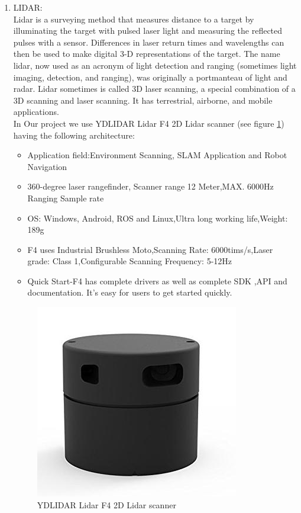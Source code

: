 \begin{enumerate}
   \item LIDAR: \\
   Lidar is a surveying method that measures distance to a target by illuminating the target with pulsed laser light and measuring the reflected pulses with a sensor. Differences in laser return times and wavelengths can then be used to make digital 3-D representations of the target. The name lidar, now used as an acronym of light detection and ranging (sometimes light imaging, detection, and ranging), was originally a portmanteau of light and radar. Lidar sometimes is called 3D laser scanning, a special combination of a 3D scanning and laser scanning. It has terrestrial, airborne, and mobile applications. \cite{web010}\\
   In Our project we use YDLIDAR Lidar F4  2D Lidar scanner (see figure \ref{fig:ydlidar}) having the following architecture:
    
    \begin{itemize}
        \item Application field:Environment Scanning, SLAM Application and Robot Navigation
        \item 360-degree laser rangefinder, Scanner range 12 Meter,MAX. 6000Hz Ranging Sample rate
        \item OS: Windows, Android, ROS and Linux,Ultra long working life,Weight: 189g
        \item F4 uses Industrial Brushless Moto,Scanning Rate: 6000tims/s,Laser grade: Class 1,Configurable Scanning Frequency: 5-12Hz
        \item Quick Start-F4 has complete drivers as well as complete SDK ,API and documentation. It's easy for users to get started quickly.
    \end{itemize}{}
    
     \begin{figure}[H]%
    \center%
    \includegraphics[width=.5\textwidth]
    {images/Alzahraa/lidar_ydlidar.jpg}%
    \caption[YDLIDAR LIDAR]{YDLIDAR Lidar F4  2D Lidar scanner}\label{fig:ydlidar}%
  \end{figure}
   

\end{enumerate}
